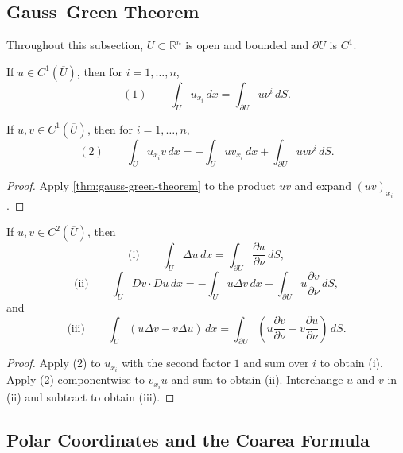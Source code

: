 \subsection{Gauss--Green Theorem}

Throughout this subsection, $U\subset\mathbb R^n$ is open and bounded and $\partial U$ is $C^1$.

\begin{theorem}
\label{thm:gauss-green-theorem}
If $u\in C^1(\overline U)$, then for $i=1,\ldots,n$,
\[
(1)\qquad
\int_Uu_{x_i}\,dx
=\int_{\partial U}u\nu^i\,dS.
\]
\end{theorem}

\begin{theorem}
\label{thm:integration-by-parts-formula}
If $u,v\in C^1(\overline U)$, then for $i=1,\ldots,n$,
\[
(2)\qquad
\int_Uu_{x_i}v\,dx
=-\int_Uuv_{x_i}\,dx
+\int_{\partial U}uv\nu^i\,dS.
\]
\end{theorem}
\begin{proof}
\sketch Apply \cref{thm:gauss-green-theorem} to the product $uv$ and expand $(uv)_{x_i}$.
\end{proof}

\begin{theorem}
\label{thm:greens-formulas}
If $u,v\in C^2(\overline U)$, then
\[
\text{(i)}\qquad
\int_U\Delta u\,dx
=\int_{\partial U}\frac{\partial u}{\partial\nu}\,dS,
\]
\[
\text{(ii)}\qquad
\int_UDv\cdot Du\,dx
=-\int_Uu\Delta v\,dx
+\int_{\partial U}u\frac{\partial v}{\partial\nu}\,dS,
\]
and
\[
\text{(iii)}\qquad
\int_U(u\Delta v-v\Delta u)\,dx
=\int_{\partial U}
\left(u\frac{\partial v}{\partial\nu}
-v\frac{\partial u}{\partial\nu}\right)\,dS.
\]
\end{theorem}
\begin{proof}
\sketch Apply (2) to $u_{x_i}$ with the second factor $1$ and sum over $i$ to obtain (i). Apply (2) componentwise to $v_{x_i}u$ and sum to obtain (ii). Interchange $u$ and $v$ in (ii) and subtract to obtain (iii).
\end{proof}

\subsection{Polar Coordinates and the Coarea Formula}


